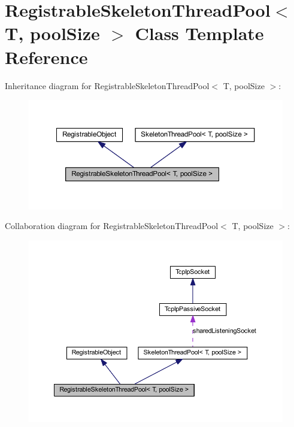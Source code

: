 \hypertarget{class_registrable_skeleton_thread_pool}{
\section{RegistrableSkeletonThreadPool$<$ T, poolSize $>$ Class Template Reference}
\label{class_registrable_skeleton_thread_pool}
}


Inheritance diagram for RegistrableSkeletonThreadPool$<$ T, poolSize $>$:\nopagebreak
\begin{figure}[H]
\begin{center}
\leavevmode
\includegraphics[width=362pt]{class_registrable_skeleton_thread_pool__inherit__graph}
\end{center}
\end{figure}


Collaboration diagram for RegistrableSkeletonThreadPool$<$ T, poolSize $>$:\nopagebreak
\begin{figure}[H]
\begin{center}
\leavevmode
\includegraphics[width=396pt]{class_registrable_skeleton_thread_pool__coll__graph}
\end{center}
\end{figure}
